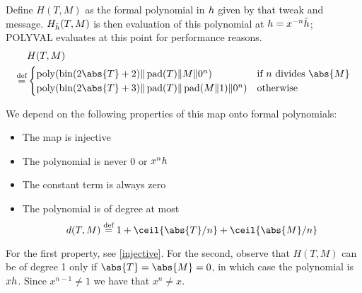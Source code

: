 \documentclass[hctr2.tex]{subfiles}
\begin{document}
Define \(H(T, M)\) as the formal polynomial in \(h\) given
by that tweak and message.
\(H_{\bar{h}}(T, M)\) is then evaluation of this polynomial at
\(h = x^{-n}\bar{h}\); POLYVAL evaluates at this point for
performance reasons.
\begin{align*}
    & H(T, M) \\
    \defeq &
    \begin{cases}
        \poly(\fromint(2\abs{T} + 2) \Concat \pad(T) \Concat M \Concat 0^n) &
        \text{if } n \text{ divides } \abs{M} \\
        \poly(\fromint(2\abs{T} + 3) \Concat \pad(T) \Concat \pad(M \Concat 1) \Concat 0^n) &
        \text{otherwise}
    \end{cases}
\end{align*}

We depend on the following properties of this map 
onto formal polynomials:
\begin{itemize}
    \item The map is injective
    \item The polynomial is never \(0\) or \(x^nh\)
    \item The constant term is always zero
    \item The polynomial is of degree at most
    \begin{displaymath}
        d(T, M) \defeq 1 + \ceil{\abs{T}/n} + \ceil{\abs{M}/n}
    \end{displaymath}
\end{itemize}

For the first property, see \autoref{injective}.
For the second, observe that \(H(T, M)\)
can be of degree 1 only if \(\abs{T} = \abs{M} = 0\),
in which case the polynomial is \(xh\).
Since \(x^{n-1} \neq 1\) we have that \(x^n \neq x\).
\end{document}
